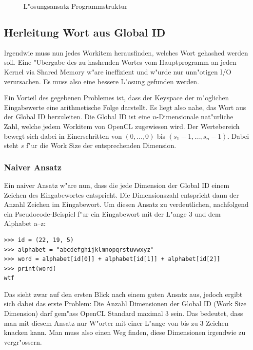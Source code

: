 \begin{refsection}
\begin{figure}[H]
	\centering
	
	\caption{L"osungsansatz Programmstruktur}
	\label{img:crypto:programm-struktur}
\end{figure}

\subsection{Herleitung Wort aus Global ID}

Irgendwie muss nun jedes Workitem herausfinden, welches Wort gehashed werden soll. Eine
"Ubergabe des zu hashenden Wortes vom Hauptprogramm an jeden Kernel via Shared
Memory w"are ineffizient und w"urde nur unn"otigen I/O verursachen. Es muss also
eine bessere L"osung gefunden werden.

Ein Vorteil des gegebenen Problemes ist, dass der Keyspace der m"oglichen
Eingabewerte eine arithmetische Folge darstellt. Es liegt also nahe, das Wort
aus der Global ID herzuleiten. Die Global ID ist eine $n$-Dimensionale
nat"urliche Zahl, welche jedem Workitem von OpenCL zugewiesen wird. Der
Wertebereich bewegt sich dabei in Einerschritten von $(0, ..., 0)$ bis $(s_1-1,
..., s_n-1)$. Dabei steht $s$ f"ur die Work Size der entsprechenden
Dimension.

\subsubsection{Naiver Ansatz}

Ein naiver Ansatz w"are nun, dass die jede Dimension der Global ID einem Zeichen
des Eingabewortes entspricht. Die Dimensionszahl entspricht dann der Anzahl
Zeichen im Eingabewort. Um diesen Ansatz zu verdeutlichen, nachfolgend ein
Pseudocode-Beispiel f"ur ein Eingabewort mit der L"ange 3 und dem Alphabet a--z:

\begin{small}
\begin{verbatim}
>>> id = (22, 19, 5)
>>> alphabet = "abcdefghijklmnopqrstuvwxyz"
>>> word = alphabet[id[0]] + alphabet[id[1]] + alphabet[id[2]]
>>> print(word)
wtf
\end{verbatim}
\end{small}

\noindent Das sieht zwar auf den ersten Blick nach einem guten Ansatz aus,
jedoch ergibt sich dabei das erste Problem: Die Anzahl Dimensionen der Global ID
(Work Size Dimension) darf gem"ass OpenCL Standard\cite{crypto:opencl_ref}
maximal 3 sein. Das bedeutet, dass man mit diesem Ansatz nur W"orter mit einer
L"ange von bis zu 3 Zeichen knacken kann. Man muss also einen Weg finden, diese
Dimensionen irgendwie zu vergr"ossern.


\end{refsection}
